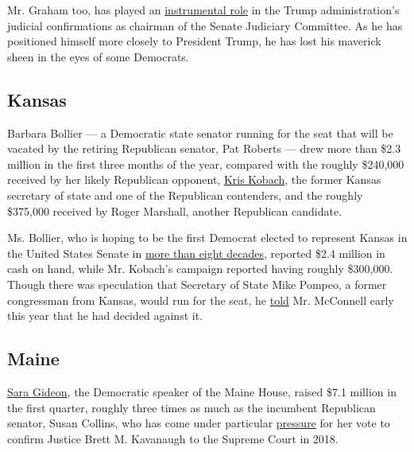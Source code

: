 Mr. Graham too, has played an
\href{https://www.nytimes3xbfgragh.onion/2020/03/14/us/trump-appeals-court-judges.html}{instrumental
role} in the Trump administration's judicial confirmations as chairman
of the Senate Judiciary Committee. As he has positioned himself more
closely to President Trump, he has lost his maverick sheen in the eyes
of some Democrats.

\hypertarget{kansas}{%
\subsection{Kansas}\label{kansas}}

Barbara Bollier --- a Democratic state senator running for the seat that
will be vacated by the retiring Republican senator, Pat Roberts --- drew
more than \$2.3 million in the first three months of the year, compared
with the roughly \$240,000 received by her likely Republican opponent,
\href{https://www.nytimes3xbfgragh.onion/2019/07/08/us/politics/kris-kobach-senate.html}{Kris
Kobach}, the former Kansas secretary of state and one of the Republican
contenders, and the roughly \$375,000 received by Roger Marshall,
another Republican candidate.

Ms. Bollier, who is hoping to be the first Democrat elected to represent
Kansas in the United States Senate in
\href{https://www.kansascity.com/news/politics-government/article242025641.html}{more
than eight decades}, reported \$2.4 million in cash on hand, while Mr.
Kobach's campaign reported having roughly \$300,000. Though there was
speculation that Secretary of State Mike Pompeo, a former congressman
from Kansas, would run for the seat, he
\href{https://www.nytimes3xbfgragh.onion/2020/01/06/us/politics/mike-pompeo-senate-kansas.html}{told}
Mr. McConnell early this year that he had decided against it.

\hypertarget{maine}{%
\subsection{Maine}\label{maine}}

\href{https://www.nytimes3xbfgragh.onion/2019/06/24/us/politics/sara-gideon-susan-collins.html}{Sara
Gideon}, the Democratic speaker of the Maine House, raised \$7.1 million
in the first quarter, roughly three times as much as the incumbent
Republican senator, Susan Collins, who has come under particular
\href{https://www.nytimes3xbfgragh.onion/2019/07/06/us/politics/susan-collins-election.html}{pressure}
for her vote to confirm Justice Brett M. Kavanaugh to the Supreme Court
in 2018.

